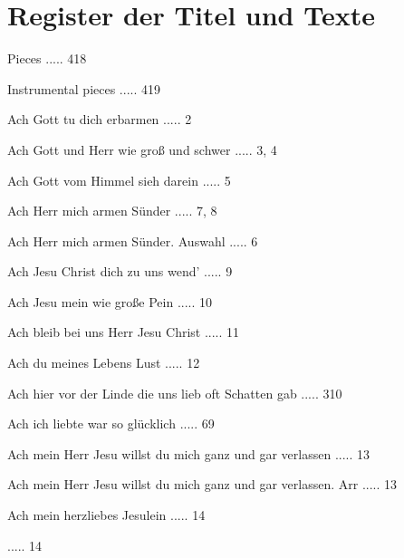 \documentclass[twocolumn]{book}
\begin{document}
    \chapter*{\centering Register der Titel und Texte}
\fancyhead{}


 Pieces ..... 418

 Instrumental pieces ..... 419

\newline 
Ach Gott tu dich erbarmen ..... 2

\newline 
Ach Gott und Herr wie groß und schwer ..... 3, 4

\newline 
Ach Gott vom Himmel sieh darein ..... 5

\newline 
Ach Herr mich armen Sünder ..... 7, 8

\newline 
Ach Herr mich armen Sünder. Auswahl ..... 6

\newline 
Ach Jesu Christ dich zu uns wend' ..... 9

\newline 
Ach Jesu mein wie große Pein ..... 10

\newline 
Ach bleib bei uns Herr Jesu Christ ..... 11

\newline 
Ach du meines Lebens Lust ..... 12

\newline 
Ach hier vor der Linde die uns lieb oft Schatten gab ..... 310

\newline 
Ach ich liebte war so glücklich ..... 69

\newline 
Ach mein Herr Jesu willst du mich ganz und gar verlassen ..... 13

\newline 
Ach mein Herr Jesu willst du mich ganz und gar verlassen. Arr ..... 13

\newline 
Ach mein herzliebes Jesulein ..... 14

 ..... 14
\end{document}
